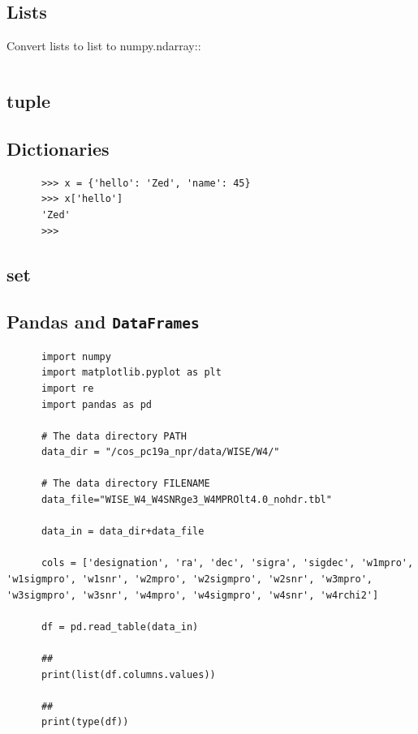 \documentclass[11pt,a4paper]{article}
\begin{document}
    \subsection{Lists}
    Convert lists to list to numpy.ndarray::
    \begin{lstlisting}

    \end{lstlisting}

    \subsection{tuple}
    
    \subsection{Dictionaries}
    \begin{lstlisting}
      >>> x = {'hello': 'Zed', 'name': 45}
      >>> x['hello']
      'Zed'
      >>> 
    \end{lstlisting}
    
    \subsection{set}

    \subsection{Pandas and {\tt DataFrames}}
    \begin{lstlisting}
      import numpy
      import matplotlib.pyplot as plt
      import re
      import pandas as pd 
      
      # The data directory PATH
      data_dir = "/cos_pc19a_npr/data/WISE/W4/"
      
      # The data directory FILENAME
      data_file="WISE_W4_W4SNRge3_W4MPROlt4.0_nohdr.tbl"
      
      data_in = data_dir+data_file
      
      cols = ['designation', 'ra', 'dec', 'sigra', 'sigdec', 'w1mpro', 'w1sigmpro', 'w1snr', 'w2mpro', 'w2sigmpro', 'w2snr', 'w3mpro', 'w3sigmpro', 'w3snr', 'w4mpro', 'w4sigmpro', 'w4snr', 'w4rchi2']
      
      df = pd.read_table(data_in) 
      
      ##
      print(list(df.columns.values))
      
      ## 
      print(type(df))
    \end{lstlisting}
    
\end{document}
